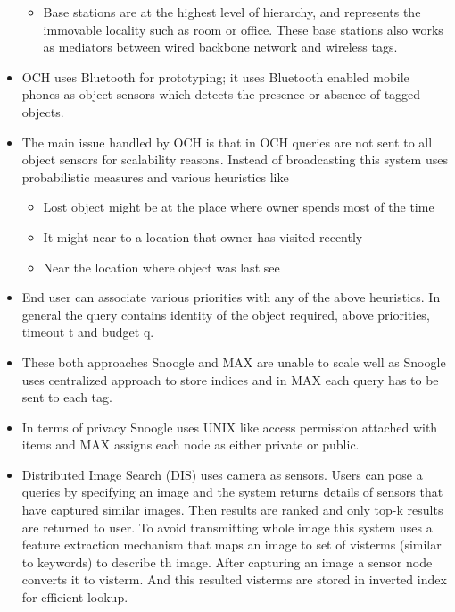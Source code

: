 \documentclass [a4paper,12pt]{book}
\begin{document}
\begin{itemize}
\begin{itemize}
\item Base stations are at the highest level of hierarchy, and represents the immovable locality such as room or office. These base stations also works as mediators between wired backbone network and wireless tags.
\end{itemize}

\item OCH uses Bluetooth for prototyping; it uses Bluetooth enabled mobile phones as object sensors which detects the presence or absence of tagged objects.

\item The main issue handled by OCH is that in OCH queries are not sent to all object sensors for scalability reasons. Instead of broadcasting this system uses probabilistic measures and various heuristics like
\begin{itemize}
\item Lost object might be at the place where owner spends most of the time
\item It might near to a location that owner has visited recently 
\item Near the location where object was last see
\end{itemize}

\item End user can associate various priorities with any of the above heuristics. In general the query contains identity of the object required, above priorities, timeout t and budget q.

\item These both approaches Snoogle and MAX are unable to scale well as Snoogle uses centralized approach to store indices and in MAX each query has to be sent to each tag.

\item In terms of privacy Snoogle uses UNIX like access permission attached with items and MAX assigns each node as either private or public.

\item Distributed Image Search (DIS)\cite{15} uses camera as sensors. Users can pose a queries by specifying an image and the system returns details of sensors that have captured similar images. Then results are ranked and only top-k results are returned to user. To avoid transmitting whole image this system uses a feature extraction mechanism that maps an image to set of visterms (similar to keywords) to describe th image. After capturing an image a sensor node converts it to visterm. And this resulted visterms are stored in inverted index for efficient lookup.

\end{itemize}
\end{document}
